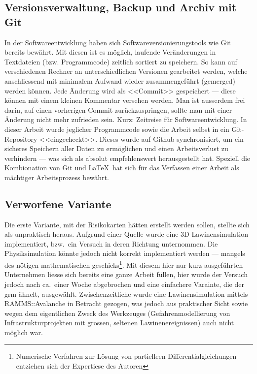 \subsection{Versionsverwaltung, Backup und Archiv mit Git}

In der Softwareentwicklung haben sich Softwareversionierungstools wie Git bereits bewährt. Mit diesen ist es möglich, laufende Veränderungen in Textdateien (bzw. Programmcode) zeitlich sortiert zu speichern. So kann auf verschiedenen Rechner an unterschiedlichen Versionen gearbeitet werden, welche anschliessend mit minimalem Aufwand wieder zusammengeführt (gemerged) werden können. Jede Änderung wird als <<Commit>> gespeichert --- diese können mit einem kleinen Kommentar versehen werden. Man ist ausserdem frei darin, auf einen vorherigen Commit zurückzuspringen, sollte man mit einer Änderung nicht mehr zufrieden sein. Kurz: Zeitreise für Softwareentwicklung. 
In dieser Arbeit wurde jeglicher Programmcode sowie die Arbeit selbst in ein Git-Repository <<eingecheckt>>. Dieses wurde auf Github synchronisiert, um ein sicheres Speichern aller Daten zu ermöglichen und einen Arbeitsverlust zu verhindern --- was sich als absolut empfehlenswert herausgestellt hat. Speziell die Kombionation von Git und \LaTeX\ hat sich für das Verfassen einer Arbeit als mächtiger Arbeitsprozess bewährt.

\subsection{Verworfene Variante}

Die erste Variante, mit der Risikokarten hätten erstellt werden sollen, stellte sich als unpraktisch heraus. Aufgrund einer Quelle wurde eine 3D-Lawinensimulation implementiert, bzw.\ ein Versuch in deren Richtung unternommen. Die Physiksimulation könnte jedoch nicht korrekt implementiert werden --- mangels des nötigen mathematischen geschicks\footnote{Numerische Verfahren zur Lösung von partielleen Differentialgleichungen entziehen sich der Expertiese des Autoren}. Mit diesem hier nur kurz ausgeführten Unternehmen liesse sich bereits eine ganze Arbeit füllen, hier wurde der Versuch jedoch nach ca.\ einer Woche abgebrochen und eine einfachere Varainte, die der \gls{grm} ähnelt, ausgewählt. Zwischenzeitliche wurde eine Lawinensimulation mittels RAMMS::Avalanche in Betracht gezogen, was jedoch aus praktischer Sicht sowie wegen dem eigentlichen Zweck des Werkzeuges (Gefahrenmodellierung von Infrastrukturprojekten mit grossen, seltenen Lawinenereignissen) auch nicht möglich war.

